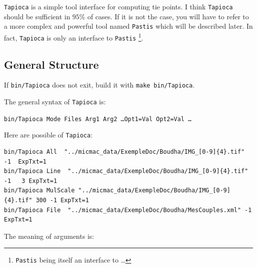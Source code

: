 {\tt Tapioca} is a simple tool interface for computing tie points.
I think {\tt Tapioca}  should be sufficient in $95\%$ of cases.
If it is not the case, you will have to refer to a more complex and powerful
tool named {\tt Pastis} which will be described later.
In fact, {\tt Tapioca} is only an interface to {\tt Pastis}
\footnote{{\tt Pastis}  being itself an interface to \SiftPP \dots}.

\label{Tapioca}


\subsection{General Structure}

If {\tt bin/Tapioca} does not exit, build it with {\tt make bin/Tapioca}.

The general syntax of {\tt Tapioca} is:

\begin{center}
   {\tt bin/Tapioca   Mode  Files  Arg1 Arg2  \dots Opt1=Val Opt2=Val \dots}
\end{center}

Here are possible  of {\tt Tapioca}:

{\scriptsize
\begin{verbatim}
bin/Tapioca All  "../micmac_data/ExempleDoc/Boudha/IMG_[0-9]{4}.tif" -1  ExpTxt=1
bin/Tapioca Line  "../micmac_data/ExempleDoc/Boudha/IMG_[0-9]{4}.tif" -1   3 ExpTxt=1
bin/Tapioca MulScale "../micmac_data/ExempleDoc/Boudha/IMG_[0-9]{4}.tif" 300 -1 ExpTxt=1
bin/Tapioca File  "../micmac_data/ExempleDoc/Boudha/MesCouples.xml" -1  ExpTxt=1
\end{verbatim}
}


The meaning of arguments is:

